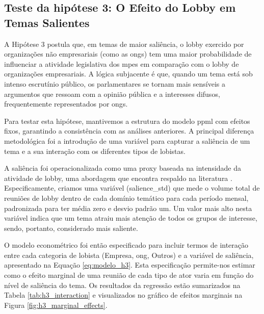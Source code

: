 \subsection{Teste da hipótese 3: O Efeito do Lobby em Temas Salientes}

A Hipótese 3 postula que, em temas de maior saliência, o lobby exercido por organizações não empresariais (como as \acrshort{ong}s) tem uma maior probabilidade de influenciar a atividade legislativa dos \acrshort{mpe}s em comparação com o lobby de organizações empresariais. A lógica subjacente é que, quando um tema está sob intenso escrutínio público, os parlamentares se tornam mais sensíveis a argumentos que ressoam com a opinião pública e a interesses difusos, frequentemente representados por \acrshort{ong}s.

Para testar esta hipótese, mantivemos a estrutura do modelo \acrshort{ppml} com efeitos fixos, garantindo a consistência com as análises anteriores. A principal diferença metodológica foi a introdução de uma variável para capturar a saliência de um tema e a sua interação com os diferentes tipos de lobistas.

A saliência foi operacionalizada como uma proxy baseada na intensidade da atividade de lobby, uma abordagem que encontra respaldo na literatura \cite{baumgartner2010agendas}. Especificamente, criamos uma variável (salience\_std) que mede o volume total de reuniões de lobby dentro de cada domínio temático para cada período mensal, padronizada para ter média zero e desvio padrão um. Um valor mais alto nesta variável indica que um tema atraiu mais atenção de todos os grupos de interesse, sendo, portanto, considerado mais saliente.

O modelo econométrico foi então especificado para incluir termos de interação entre cada categoria de lobista (Empresa, \acrshort{ong}, Outros) e a variável de saliência, apresentado na Equação \ref{eq:modelo_h3}. Esta especificação permite-nos estimar como o efeito marginal de uma reunião de cada tipo de ator varia em função do nível de saliência do tema. Os resultados da regressão estão sumarizados na Tabela \ref{tab:h3_interaction} e visualizados no gráfico de efeitos marginais na Figura \ref{fig:h3_marginal_effects}.




